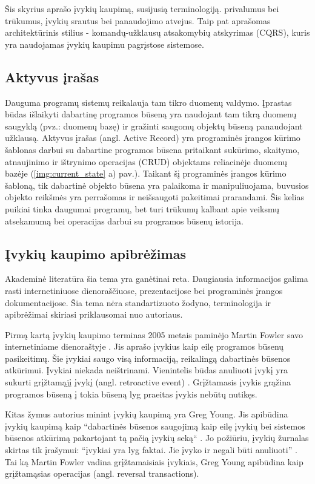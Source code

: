 Šis skyrius aprašo įvykių kaupimą, susijusią terminologiją. privalumus bei trūkumus, įvykių srautus bei panaudojimo atvejus. Taip pat aprašomas architektūrinis stilius - komandų-užklausų atsakomybių atskyrimas (CQRS), kuris yra naudojamas įvykių kaupimu pagrįstose sistemose. 

\subsection{Aktyvus įrašas}

Dauguma programų sistemų reikalauja tam tikro duomenų valdymo. Įprastas būdas išlaikyti dabartinę programos būseną yra naudojant tam tikrą duomenų saugyklą (pvz.: duomenų bazę) ir gražinti saugomų objektų būseną panaudojant užklausą. Aktyvus įrašas (angl. Active Record) yra programinės įrangos kūrimo šablonas darbui su dabartine programos būsena pritaikant sukūrimo, skaitymo, atnaujinimo ir ištrynimo operacijas (CRUD) objektams reliacinėje duomenų bazėje \cite{Fowler:2002:PEA:579257} (\ref{img:current_state} a) pav.). Taikant šį programinės įrangos kūrimo šabloną, tik dabartinė objekto būsena yra palaikoma ir manipuliuojama, buvusios objekto reikšmės yra perrašomas ir neišsaugoti pakeitimai prarandami. Šis kelias puikiai tinka daugumai programų, bet turi trūkumų kalbant apie veiksmų atsekamumą bei operacijas darbui su programos būsenų istorija.

\subsection{Įvykių kaupimo apibrėžimas}

Akademinė literatūra šia tema yra ganėtinai reta. Daugiausia informacijos galima rasti internetiniuose dienoraščiuose, prezentacijose bei programinės įrangos dokumentacijose. Šia tema nėra standartizuoto žodyno, terminologija ir apibrėžimai skiriasi priklausomai nuo autoriaus.

Pirmą kartą įvykių kaupimo terminas 2005 metais paminėjo Martin Fowler savo internetiniame dienoraštyje \cite{Fowler:EventSourcing}. Jis aprašo įvykius kaip eilę programos būsenų pasikeitimų. Šie įvykiai saugo visą informaciją, reikalingą dabartinės būsenos atkūrimui. Įvykiai niekada neištrinami. Vienintelis būdas anuliuoti įvykį yra sukurti grįžtamąjį įvykį (angl. retroactive event) \cite{Fowler:RetroactiveEvent}. Grįžtamasis įvykis grąžina programos būseną į tokia būseną lyg praeitas įvykis nebūtų nutikęs.

Kitas žymus autorius minint įvykių kaupimą yra Greg Young. Jis apibūdina įvykių kaupimą kaip “dabartinės būsenos saugojimą kaip eilę įvykių bei sistemos būsenos atkūrimą pakartojant tą pačią įvykių seką“ \cite{Young:CQRS2010}. Jo požiūriu, įvykių žurnalas skirtas tik įrašymui: “įvykiai yra lyg faktai. Jie įvyko ir negali būti anuliuoti” \cite{Young:CQRS2013}. Tai ką Martin Fowler vadina grįžtamaisiais įvykiais, Greg Young apibūdina kaip grįžtamąsias operacijas (angl. reversal transactions).

